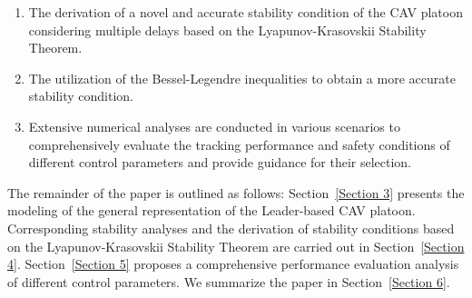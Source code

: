 \documentclass[a4paper]{cas-sc}
\begin{document}
\begin{enumerate}
  \item The derivation of a novel and accurate stability condition of the CAV platoon considering multiple delays based on the Lyapunov-Krasovskii Stability Theorem.
  \item The utilization of the Bessel-Legendre inequalities to obtain a more accurate stability condition.
  \item Extensive numerical analyses are conducted in various scenarios to comprehensively evaluate the tracking performance and safety conditions of different control parameters and provide guidance for their selection.
\end{enumerate}










The remainder of the paper is outlined as follows: Section~\ref{Section 3} presents the modeling of the general representation of the Leader-based CAV platoon. Corresponding stability analyses and the derivation of stability conditions based on the Lyapunov-Krasovskii Stability Theorem are carried out in Section~\ref{Section 4}. Section~\ref{Section 5} proposes a comprehensive performance evaluation analysis of different control parameters. We summarize the paper in Section~\ref{Section 6}.
\end{document}
